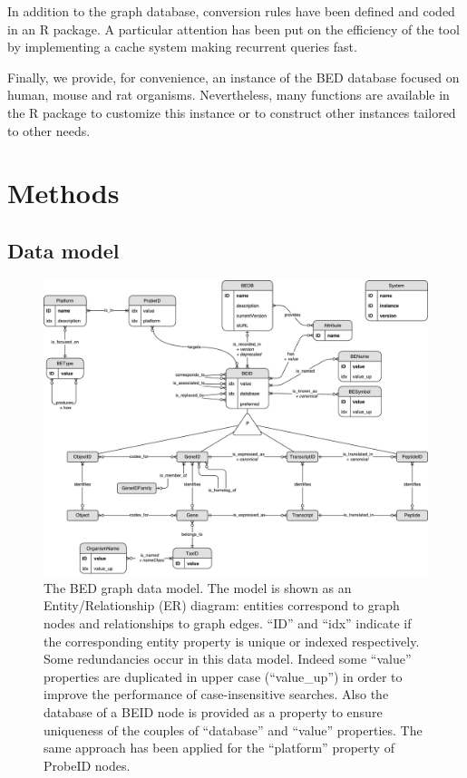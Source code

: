\documentclass[9pt,a4paper,]{extarticle}
\theoremstyle{definition}
\theoremstyle{definition}
\theoremstyle{definition}
\theoremstyle{remark}
\begin{document}
In addition to the \neo{} graph database,
conversion rules have been defined and coded in
an R \citep{r_core_team_r:_2017} package. A particular attention has been put
on the efficiency of the tool by implementing a cache system making
recurrent queries fast.

Finally, we provide, for convenience, an instance of the BED database focused
on human, mouse and rat organisms. Nevertheless, many functions are available
in the R package to customize this instance or to construct other instances
tailored to other needs.

\section{Methods}\label{methods}

\subsection{Data model}\label{data-model}

\begin{figure}

{\centering \includegraphics[width=1\linewidth]{img/BED-Data-Model} 

}

\caption{The BED graph data model. The model is shown as an Entity/Relationship (ER) diagram: entities correspond to graph nodes and relationships to graph edges. ``ID'' and ``idx'' indicate if the corresponding entity property is unique or indexed respectively. Some redundancies occur in this data model. Indeed some ``value'' properties are duplicated in upper case (``value\_up'') in order to improve the performance of case-insensitive searches. Also the database of a BEID node is provided as a property to ensure uniqueness of the couples of ``database'' and ``value'' properties. The same approach has been applied for the ``platform'' property of ProbeID nodes.}\label{fig:Data-Model}
\end{figure}
\end{document}
